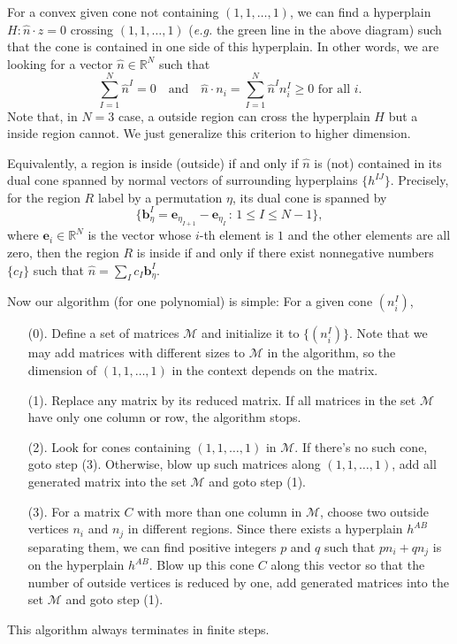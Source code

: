 \documentclass[12pt]{article}
\theoremstyle{definition}
\theoremstyle{plain}
\begin{document}
\begin{enumerate}
	For a convex given cone not containing $(1,1,\dots,1)$, 
	we can find a hyperplain $H:\hat{n}\cdot z=0$ crossing
	$(1,1,\dots,1)$ (\textit{e.g.} the green line in the above diagram) 
	such that the cone is contained in one side of this hyperplain.
	In other words, we are looking for a vector $\hat{n}\in \mathbb R^N$ 
	such that
	\[
		\sum_{I=1}^N \hat{n}^I=0\quad \text{and}\quad \hat{n}\cdot
		n_i=\sum_{I=1}^N\hat{n}^In^I_i\geq 0 \text{ for all $i$}.
	\]
	Note that, in $N=3$ case, a outside region can cross the hyperplain $H$ 
	but a inside region cannot. We just generalize this criterion to 
	higher dimension.
	
	Equivalently, a region is inside (outside) if and only if $\hat{n}$ 
	is (not) contained in its dual cone spanned by normal vectors of 
	surrounding hyperplains $\{h^{IJ}\}$. Precisely, 
	for the region $R$ label by a permutation $\eta$,
	its dual cone is spanned by
	\[
		\{\mathbf{b}^I_\eta=\mathbf{e}_{\eta_{I+1}}-\mathbf{e}_{\eta_{I}}
		\,:\, 1\leq I\leq N-1\},
	\]
	where $\mathbf{e}_i\in \mathbb R^N$ is the vector whose $i$-th element 
	is $1$ and the other elements are all zero, then
	the region $R$ is inside if and only if there exist nonnegative numbers
	$\{c_I\}$ such that $\hat{n}=\sum_I c_I\mathbf{b}^I_\eta$.
\end{enumerate}
%
Now our algorithm (for one polynomial) is simple: For a given cone $(n^I_i)$,
\begin{enumerate}
	\item[(0).] Define a set of matrices $\mathcal M$ and initialize it 
		to $\{(n^I_i)\}$. Note that we may add matrices with different 
		sizes to $\mathcal M$ in the algorithm, so the dimension of 
		$(1,1,\dots,1)$ in the context depends on the matrix.
	\item[(1).] Replace any matrix by its reduced matrix. If all matrices
		in the set $\mathcal M$ have only one column or row, 
		the algorithm stops.
	\item[(2).] 
		Look for cones containing $(1,1,\dots,1)$ in $\mathcal M$.
		If there's no such cone, goto step (3).
		Otherwise, blow up such matrices along $(1,1,\dots,1)$, 
		add all generated matrix into the set $\mathcal M$ and goto step (1).
	\item[(3).] 
		For a matrix $C$ with more than one column in $\mathcal M$, 
		choose two outside vertices $n_i$ and $n_j$ in different regions.
		Since there exists a hyperplain $h^{AB}$ separating them, 
		we can find positive integers $p$ and $q$ such that
		$pn_i+qn_j$ is on the hyperplain $h^{AB}$. 
		Blow up this cone $C$ along this vector so that the number of 
		outside vertices is reduced by one, add generated matrices into 
		the set $\mathcal M$ and goto step (1).
\end{enumerate}
%
This algorithm always terminates in finite steps. 
\end{document}
